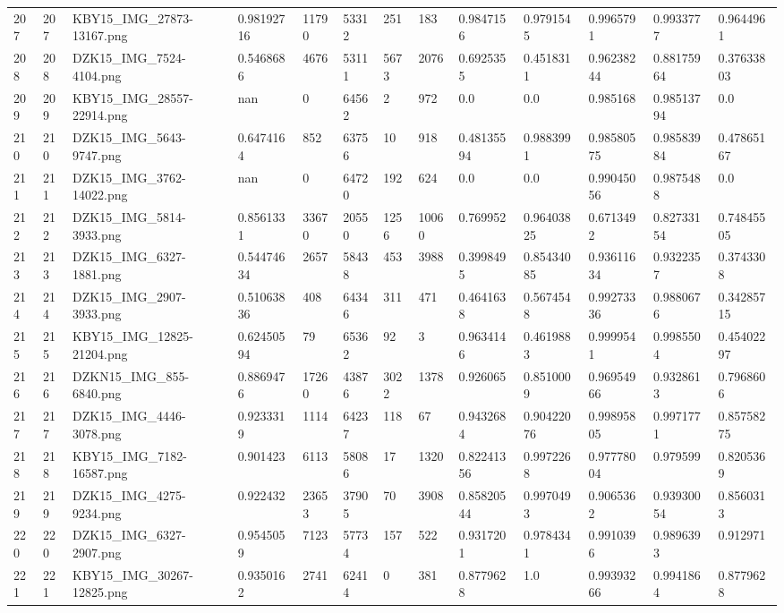 \documentclass[11pt, a4paper, twoside]{report}
\begin{document}
\begin{longtable}[c]{@{}lllllllllllll@{}}
207 & 207 & KBY15\_IMG\_27873-13167.png & 0.98192716 & 11790 & 53312 & 251 & 183 & 0.9847156 & 0.9791545 & 0.9965791 & 0.9933777 & 0.9644961 \\
208 & 208 & DZK15\_IMG\_7524-4104.png & 0.5468686 & 4676 & 53111 & 5673 & 2076 & 0.6925355 & 0.4518311 & 0.96238244 & 0.88175964 & 0.37633803 \\
209 & 209 & KBY15\_IMG\_28557-22914.png & nan & 0 & 64562 & 2 & 972 & 0.0 & 0.0 & 0.985168 & 0.98513794 & 0.0 \\
210 & 210 & DZK15\_IMG\_5643-9747.png & 0.6474164 & 852 & 63756 & 10 & 918 & 0.48135594 & 0.9883991 & 0.98580575 & 0.98583984 & 0.47865167 \\
211 & 211 & DZK15\_IMG\_3762-14022.png & nan & 0 & 64720 & 192 & 624 & 0.0 & 0.0 & 0.99045056 & 0.9875488 & 0.0 \\
212 & 212 & DZK15\_IMG\_5814-3933.png & 0.8561331 & 33670 & 20550 & 1256 & 10060 & 0.769952 & 0.96403825 & 0.6713492 & 0.82733154 & 0.74845505 \\
213 & 213 & DZK15\_IMG\_6327-1881.png & 0.54474634 & 2657 & 58438 & 453 & 3988 & 0.3998495 & 0.85434085 & 0.93611634 & 0.9322357 & 0.3743308 \\
214 & 214 & DZK15\_IMG\_2907-3933.png & 0.51063836 & 408 & 64346 & 311 & 471 & 0.4641638 & 0.5674548 & 0.99273336 & 0.9880676 & 0.34285715 \\
215 & 215 & KBY15\_IMG\_12825-21204.png & 0.62450594 & 79 & 65362 & 92 & 3 & 0.9634146 & 0.4619883 & 0.9999541 & 0.9985504 & 0.45402297 \\
216 & 216 & DZKN15\_IMG\_855-6840.png & 0.8869476 & 17260 & 43876 & 3022 & 1378 & 0.926065 & 0.8510009 & 0.96954966 & 0.9328613 & 0.7968606 \\
217 & 217 & DZK15\_IMG\_4446-3078.png & 0.9233319 & 1114 & 64237 & 118 & 67 & 0.9432684 & 0.90422076 & 0.99895805 & 0.9971771 & 0.85758275 \\
218 & 218 & KBY15\_IMG\_7182-16587.png & 0.901423 & 6113 & 58086 & 17 & 1320 & 0.82241356 & 0.9972268 & 0.97778004 & 0.979599 & 0.8205369 \\
219 & 219 & DZK15\_IMG\_4275-9234.png & 0.922432 & 23653 & 37905 & 70 & 3908 & 0.85820544 & 0.9970493 & 0.9065362 & 0.93930054 & 0.8560313 \\
220 & 220 & DZK15\_IMG\_6327-2907.png & 0.9545059 & 7123 & 57734 & 157 & 522 & 0.9317201 & 0.9784341 & 0.9910396 & 0.9896393 & 0.912971 \\
221 & 221 & KBY15\_IMG\_30267-12825.png & 0.9350162 & 2741 & 62414 & 0 & 381 & 0.8779628 & 1.0 & 0.99393266 & 0.9941864 & 0.8779628 \\

\end{longtable}
\end{document}
